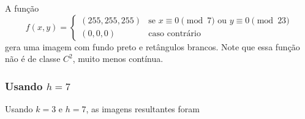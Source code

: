 \documentclass{article}
\begin{document}
A função 
\begin{equation}
  f(x,y) = \begin{cases}
    (255, 255, 255) &\text{se } x \equiv 0 \pmod 7 \text{ ou } y \equiv 0 \pmod{23} \\
    (0, 0, 0) &\text{caso contrário}  
  \end{cases}
\end{equation}
gera uma imagem com fundo preto e retângulos brancos.
Note que essa função não é de classe $C^2$, muito menos contínua.

\subsubsection[Usando h=7]{Usando $h=7$}

Usando $k=3$ e $h=7$, as imagens resultantes foram
\end{document}
